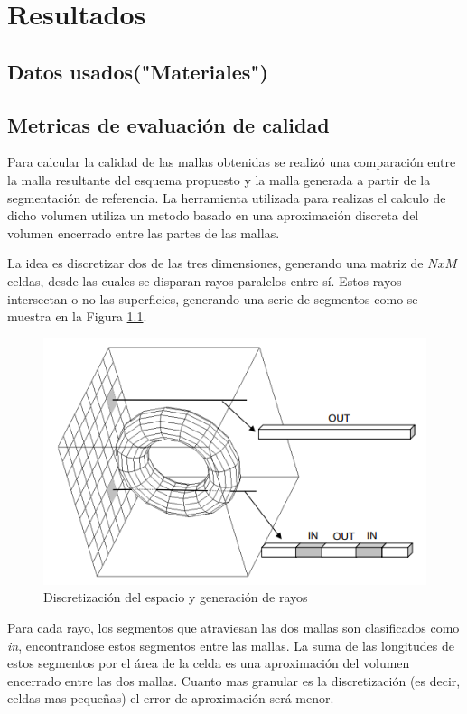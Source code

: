 \chapter{Resultados}
\section{Datos usados("Materiales")}
\section{Metricas de evaluación de calidad}
Para calcular la calidad de las mallas obtenidas se realizó una comparación entre la malla resultante del esquema propuesto y la malla generada a partir de la segmentación de referencia. La herramienta utilizada para realizas el calculo de dicho volumen utiliza un metodo basado en una aproximación discreta del volumen encerrado entre las partes de las mallas.

La idea es discretizar dos de las tres dimensiones, generando una matriz de $ N x M $ celdas, desde las cuales se disparan rayos paralelos entre sí. Estos rayos intersectan o no las superficies, generando una serie de segmentos como se muestra en la Figura \ref{fig:discretizacionvolumen}. 

\begin{figure}[h]
\centering
\includegraphics[scale=0.5]{images/disctretizacion.png}
\caption{Discretización del espacio y generación de rayos}
\label{fig:discretizacionvolumen}
\end{figure}

Para cada rayo, los segmentos que atraviesan las dos mallas son clasificados como \emph{in}, encontrandose estos segmentos entre las mallas. La suma de las longitudes de estos segmentos por el área de la celda es una aproximación del volumen encerrado entre las dos mallas. Cuanto mas granular es la discretización (es decir, celdas mas pequeñas) el error de aproximación será menor.
